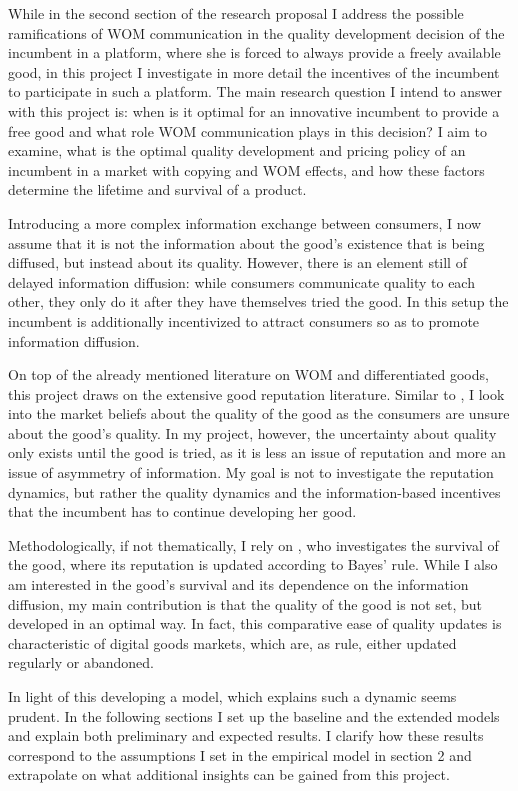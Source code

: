 \documentclass[13pt]{article}
\numberwithin{figure}{section}
\numberwithin{table}{section}
\theoremstyle{indented}
\numberwithin{equation}{section} %
\begin{document}
While in the second section of the research proposal I address the possible ramifications of WOM communication in the quality development decision of the incumbent in a platform, where she is forced to always provide a freely available good, in this project I investigate in more detail the incentives of the incumbent to participate in such a platform. The main research question I intend to answer with this project is: when is it optimal for an innovative incumbent to provide a free good and what role WOM communication plays in this decision? I aim to examine, what is the optimal quality development and pricing policy of an incumbent in a market with copying and WOM effects, and how these factors determine the lifetime and survival of a product.

Introducing a more complex information exchange between consumers, I now assume that it is not the information about the good's existence that is being diffused, but instead about its quality. However, there is an element still of delayed information diffusion: while consumers communicate quality to each other, they only do it after they have themselves tried the good. In this setup the incumbent is additionally incentivized to attract consumers so as to promote information diffusion.

On top of the already mentioned literature on WOM and differentiated goods, this project draws on the extensive good reputation literature. Similar to \citet{Board2014}, I look into the market beliefs about the quality of the good as the consumers are unsure about the good's quality. In my project, however, the uncertainty about quality only exists until the good is tried, as it is less an issue of reputation and more an issue of asymmetry of information. My goal is not to investigate the reputation dynamics, but rather the quality dynamics and the information-based incentives that the incumbent has to continue developing her good. 

Methodologically, if not thematically, I rely on \citet{Isaac2003}, who investigates the survival of the good, where its reputation is updated according to Bayes' rule. While I also am interested in the good's survival and its dependence on the information diffusion, my main contribution is that the quality of the good is not set, but developed in an optimal way. In fact, this comparative ease of quality updates is characteristic of digital goods markets, which are, as rule, either updated regularly or abandoned.

In light of this developing a model, which explains such a dynamic seems prudent. In the following sections I set up the baseline and the extended models and explain both preliminary and expected results. I clarify how these results correspond to the assumptions I set in the empirical model in section 2 and extrapolate on what additional insights can be gained from this project. 
\end{document}
